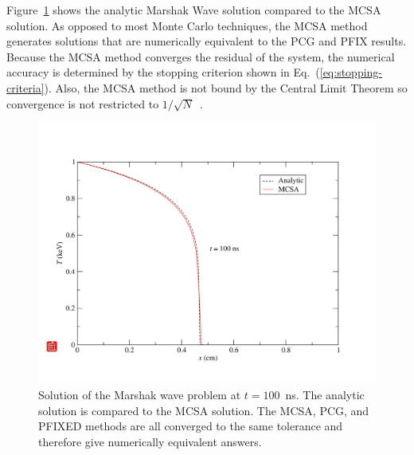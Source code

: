 \documentclass[preprint,12pt]{elsarticle}
\begin{document}
Figure~\ref{fig:marshak_10} shows the analytic Marshak Wave solution compared
to the MCSA solution.  As opposed to most Monte Carlo techniques, the MCSA
method generates solutions that are numerically equivalent to the PCG and PFIX
results.  Because the MCSA method converges the residual of the system, the
numerical accuracy is determined by the stopping criterion shown in
Eq.~(\ref{eq:stopping-criteria}).  Also, the MCSA method is not bound by the
Central Limit Theorem so convergence is not restricted to
$1/\sqrt{N}$~\cite{halton_1994,evans_2003}.
\begin{figure}[ht!]
  \centerline{ \includegraphics[width=5in,clip]{marshak_10.pdf}}
  \caption{ Solution of the Marshak wave problem at $t=100$~ns.  The analytic
    solution is compared to the MCSA solution.  The MCSA, PCG, and PFIXED
    methods are all converged to the same tolerance and therefore give
    numerically equivalent answers.}
  \label{fig:marshak_10}
\end{figure}
\end{document}
